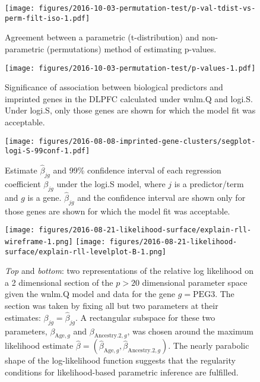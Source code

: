\documentclass[letterpaper]{article}
\begin{document}
\begin{figure}
\begin{center}
\texttt{[image: figures/2016-10-03-permutation-test/p-val-tdist-vs-perm-filt-iso-1.pdf]}
\end{center}
\caption{Agreement between a parametric (t-distribution) and non-parametric
(permutations) method of estimating p-values.}
\label{fig:pval-tdist-vs-perm}
\end{figure}

\begin{figure}
\begin{center}
\texttt{[image: figures/2016-10-03-permutation-test/p-values-1.pdf]}
\end{center}
\caption{
Significance of association between biological predictors and imprinted genes
in the DLPFC calculated under wnlm.Q and logi.S.  Under logi.S, only those
genes are shown for which the model fit was acceptable.
}
\label{fig:pval}
\end{figure}

\begin{figure}
\begin{center}
\texttt{[image: figures/2016-08-08-imprinted-gene-clusters/segplot-logi-S-99conf-1.pdf]}
\end{center}
\caption{
Estimate \(\hat{\beta}_{jg}\) and 99\% confidence interval of each regression coefficient
\(\beta_{jg}\) under the logi.S model, where \(j\) is a predictor/term and
\(g\) is a gene.  \(\hat{\beta}_{jg}\) and the confidence interval are shown only for those
genes are shown for which the model fit was acceptable.
}
\label{fig:biol-effects-logi.S}
\end{figure}

\begin{figure}
\begin{center}
\texttt{[image: figures/2016-08-21-likelihood-surface/explain-rll-wireframe-1.png]}
\texttt{[image: figures/2016-08-21-likelihood-surface/explain-rll-levelplot-B-1.png]}
\end{center}
\caption{
\emph{Top} and \emph{bottom}: two representations of the relative log
likelihood on a 2 dimensional section of the \(p>20\) dimensional parameter
space given the wnlm.Q model and data for the gene \(g=\mathrm{PEG3}\).  The
section was taken by fixing all but two parameters at their estimates:
\(\beta_{jg} = \hat{\beta}_{jg}\).  A rectangular subspace for these two
parameters, \(\beta_{\mathrm{Age},g}\) and  \(\beta_{\mathrm{Ancestry.2},g}\),
was chosen around the maximum likelihood estimate \(\hat{\beta} =
(\hat{\beta}_{\mathrm{Age},g}, \hat{\beta}_{\mathrm{Ancestry.2},g})\).  The
nearly parabolic shape of the log-likelihood function suggests that the
regularity conditions for likelihood-based parametric inference are fulfilled.
}
\label{fig:ll-surf-explain}
\end{figure}
\end{document}
